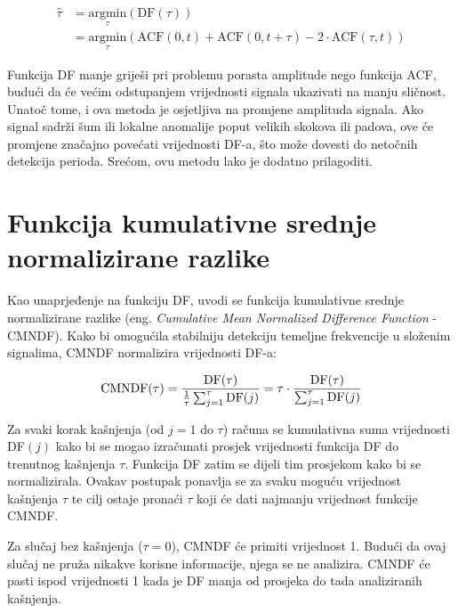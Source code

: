 \documentclass[times, utf8, diplomski, numeric]{fer}
\begin{document}
\begin{equation}
	\begin{split}
		\hat{\tau} &= \underset{\tau}{\mathrm{argmin}} (\mathrm{DF}(\tau)) \\
		&= \underset{\tau}{\mathrm{argmin}} (\mathrm{ACF}(0, t) + \mathrm{ACF}(0, t + \tau) - 2 \cdot \mathrm{ACF}(\tau, t))
	\end{split}
\end{equation}

Funkcija DF manje griješi pri problemu porasta amplitude nego funkcija ACF, budući da će većim odstupanjem vrijednosti signala ukazivati na manju sličnost. Unatoč tome, i ova metoda je osjetljiva na promjene amplituda signala. Ako signal sadrži šum ili lokalne anomalije poput velikih skokova ili padova, ove će promjene značajno povećati vrijednosti DF-a, što može dovesti do netočnih detekcija perioda. Srećom, ovu metodu lako je dodatno prilagoditi.

\section{Funkcija kumulativne srednje normalizirane razlike}
%
Kao unaprjeđenje na funkciju DF, uvodi se funkcija kumulativne srednje normalizirane razlike (eng. \textit{Cumulative Mean Normalized Difference Function} - CMNDF). Kako bi omogućila stabilniju detekciju temeljne frekvencije u složenim signalima, CMNDF normalizira vrijednosti DF-a:

\begin{equation}
	\mathrm{CMNDF}(\tau) = \frac{\mathrm{DF}(\tau)}{\frac{1}{\tau}\sum_{j = 1}^{\tau}{\mathrm{DF}(j)}} = \tau \cdot \frac{\mathrm{DF}(\tau)}{\sum_{j = 1}^{\tau}{\mathrm{DF}(j)}} \\
\end{equation}

Za svaki korak kašnjenja (od $j = 1$ do $\tau$) računa se kumulativna suma vrijednosti DF$(j)$ kako bi se mogao izračunati prosjek vrijednosti funkcija DF do trenutnog kašnjenja $\tau$. Funkcija DF zatim se dijeli tim prosjekom kako bi se normalizirala. Ovakav postupak ponavlja se za svaku moguću vrijednost kašnjenja $\tau$ te cilj ostaje pronaći $\tau$ koji će dati najmanju vrijednost funkcije CMNDF.

Za slučaj bez kašnjenja ($\tau = 0$), CMNDF će primiti vrijednost 1. Budući da ovaj slučaj ne pruža nikakve korisne informacije, njega se ne analizira. CMNDF će pasti ispod vrijednosti 1 kada je DF manja od prosjeka do tada analiziranih kašnjenja.
\end{document}
